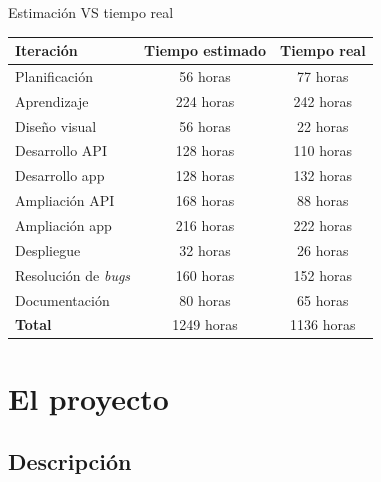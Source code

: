 \documentclass[10pt,xcolor=svgnames]{beamer}
\begin{document}
\begin{frame}{Estimación VS tiempo real}
  \begin{cambiarmargen}{-2.5cm}{-2.5cm}

    \begin{table}[hbtp]
      \centering
      \begin{tabular}{|l|c|c|}
        \hline
        \textbf{Iteración} & \textbf{Tiempo estimado} & \textbf{Tiempo real} \\
        \hline
        Planificación & 56 horas & 77 horas \\
        \hline
        Aprendizaje & 224 horas & 242 horas \\
        \hline
        Diseño visual & 56 horas & 22 horas \\
        \hline
        Desarrollo API & 128 horas & 110 horas \\
        \hline
        Desarrollo app & 128 horas & 132 horas \\
        \hline
        Ampliación API & 168 horas & 88 horas \\
        \hline
        Ampliación app & 216 horas & 222 horas \\
        \hline
        Despliegue & 32 horas & 26 horas \\
        \hline
        Resolución de \textit{bugs} & 160 horas & 152 horas \\
        \hline
        Documentación & 80 horas & 65 horas \\
        \hline
        \textbf{Total} & 1249 horas & 1136 horas \\
        \hline
      \end{tabular}
      \label{tab:estimacion_tiempo}
    \end{table}
    
  \end{cambiarmargen}
\end{frame}



\section{El proyecto}

\subsection{Descripción}
\end{document}
